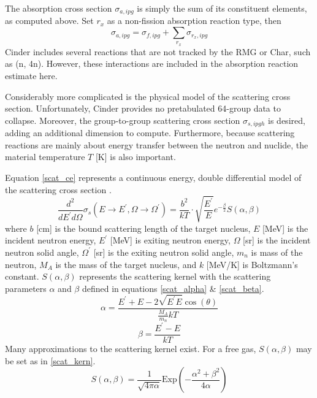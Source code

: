 The absorption cross section $\sigma_{a,ipg}$ is simply the sum of its constituent elements, as 
computed above.  Set $r_x$ as a non-fission absorption reaction type, then
\begin{equation}
\label{sig_a_model}
\sigma_{a,ipg} = \sigma_{f,ipg} + \sum_{r_x} \sigma_{r_x,ipg}
\end{equation}
Cinder includes several reactions that are not tracked by the RMG or Char, such as (n, 4n). 
However, these interactions are included in the absorption reaction estimate here.  

Considerably more complicated is the physical model of the scattering cross section.  Unfortunately, 
Cinder provides no pretabulated 64-group data to collapse.  Moreover, the group-to-group scattering
cross section $\sigma_{s,ipgh}$ is desired, adding an additional dimension to compute.
Furthermore, because scattering reactions are mainly about energy transfer between the neutron and 
nuclide, the material temperature $T$ [K] is also important.

Equation \ref{scat_ce} represents a continuous energy, double differential model of the scattering 
cross section \cite{Yamamoto2006, Mattes2005}.
\begin{equation}
\label{scat_ce}
\frac{d^2}{dE^\prime d\Omega} \sigma_s(E\to E^\prime, \Omega\to\Omega^\prime) = \frac{b^2}{kT} \cdot 
            \sqrt{\frac{E^{\prime}}{E}} e^{-\frac{\beta}{2}} S(\alpha, \beta)
\end{equation}
where $b$ [cm] is the bound scattering length of the target nucleus, $E$ [MeV] is the incident
neutron energy, $E^\prime$ [MeV] is exiting neutron energy, $\Omega$ [sr] is the incident 
neutron solid angle, $\Omega^\prime$ [sr] is the exiting neutron solid angle,
$m_n$ is mass of the neutron, 
$M_A$ is the mass of the target nucleus, and $k$ [MeV/K] is Boltzmann's constant.  $S(\alpha, \beta)$
represents the scattering kernel with the scattering parameters $\alpha$ and $\beta$ defined in 
equations \ref{scat_alpha} \& \ref{scat_beta}.
\begin{equation}
\label{scat_alpha}
\alpha = \frac{E^\prime + E - 2\sqrt{E^\prime E}\cos(\theta)}{\frac{M_A}{m_n}kT}
\end{equation}
\begin{equation}
\label{scat_beta}
\beta = \frac{E^\prime - E}{kT}
\end{equation}
Many approximations to the scattering kernel exist.  For a free gas, $S(\alpha, \beta)$ may be set 
as in \ref{scat_kern}.
\begin{equation}
\label{scat_kern}
S(\alpha, \beta) = \frac{1}{\sqrt{4\pi\alpha}} \mbox{Exp}\left(-\frac{\alpha^2 + \beta^2}{4\alpha}\right)
\end{equation}


